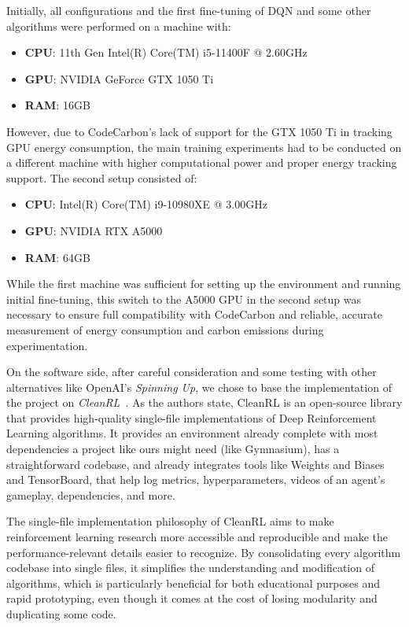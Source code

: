 Initially, all configurations and the first fine-tuning of DQN and some other algorithms were performed on a machine with:
\begin{itemize}
	\item \textbf{CPU}: 11th Gen Intel(R) Core(TM) i5-11400F @ 2.60GHz
	\item \textbf{GPU}: NVIDIA GeForce GTX 1050 Ti
	\item \textbf{RAM}: 16GB
\end{itemize}

However, due to CodeCarbon's lack of support for the GTX 1050 Ti in tracking GPU energy consumption, the main training experiments had to be conducted on a different machine with higher computational power and proper energy tracking support. The second setup consisted of:
\begin{itemize}
	\item \textbf{CPU}: Intel(R) Core(TM) i9-10980XE @ 3.00GHz
	\item \textbf{GPU}: NVIDIA RTX A5000
	\item \textbf{RAM}: 64GB
\end{itemize}
While the first machine was sufficient for setting up the environment and running initial fine-tuning, this switch to the A5000 GPU in the second setup was necessary to ensure full compatibility with CodeCarbon and reliable, accurate measurement of energy consumption and carbon emissions during experimentation.

On the software side, after careful consideration and some testing with other alternatives like OpenAI's \textit{Spinning Up}, we chose to base the implementation of the project on \textit{CleanRL}~\cite{huang:cleanrl}. As the authors state, CleanRL is an open-source library that provides high-quality single-file implementations of Deep Reinforcement Learning algorithms. It provides an environment already complete with most dependencies a project like ours might need (like Gymnasium), has a straightforward codebase, and already integrates tools like Weights and Biases and TensorBoard, that help log metrics, hyperparameters, videos of an agent's gameplay, dependencies, and more.

The single-file implementation philosophy of CleanRL aims to make reinforcement learning research more accessible and reproducible and make the performance-relevant details easier to recognize. By consolidating every algorithm codebase into single files, it simplifies the understanding and modification of algorithms, which is particularly beneficial for both educational purposes and rapid prototyping, even though it comes at the cost of losing modularity and duplicating some code.

